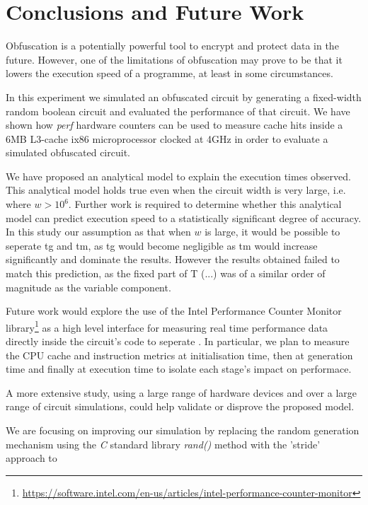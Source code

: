 \section{Conclusions and Future Work}
Obfuscation is a potentially powerful tool to encrypt and protect data in the future. However, one of the limitations of obfuscation may prove to be that it lowers the execution speed of a programme, at least in some circumstances.
\par
In this experiment we simulated an obfuscated circuit by generating a fixed-width random boolean circuit and evaluated the performance of that circuit. We have shown how \textit{perf} hardware counters can be used to measure cache hits inside a 6MB L3-cache ix86 microprocessor clocked at 4GHz in order to evaluate a simulated obfuscated circuit.
\par
We have proposed an analytical model to explain the execution times observed. This analytical model holds true even when the circuit width is very large, i.e. where $w > 10^6$. Further work is required to determine whether this analytical model can predict execution speed to a statistically significant degree of accuracy. In this study our assumption as that when $w$ is large, it would be possible to seperate tg and tm, as tg would become negligible as tm would increase significantly and dominate the results. However the results obtained failed to match this prediction, as the fixed part of T (...) was of a similar order of magnitude as the variable component.
\par
Future work would explore the use of the Intel Performance Counter Monitor library\footnote{\url{https://software.intel.com/en-us/articles/intel-performance-counter-monitor}} as a high level interface for measuring real time performance data directly inside the circuit's code to seperate . In particular, we plan to measure the CPU cache and instruction metrics at initialisation time, then at generation time and finally at execution time to isolate each stage's impact on performace.

A more extensive study, using a large range of hardware devices and over a large range of circuit simulations, could help validate or disprove the proposed model.
\par
We are focusing on improving our simulation by replacing the random generation mechanism using the \textit{C} standard library \textit{rand()} method with the ’stride’ approach\cite{stride} to 
\par
 

